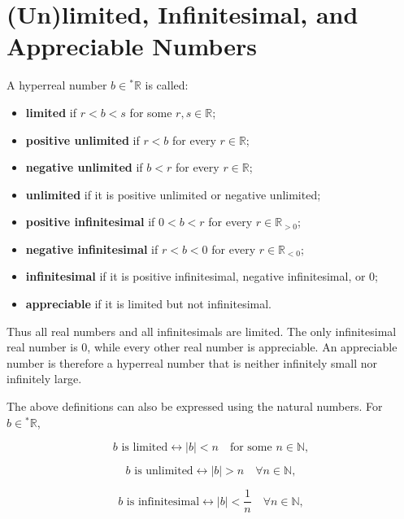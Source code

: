 \documentclass[10pt,a4paper]{book}
\begin{document}
\section{(Un)limited, Infinitesimal, and Appreciable Numbers}

A hyperreal number \(b\in{}^\ast\mathbb R\) is called:

\begin{itemize}

    \item \textbf{limited} if \(r<b<s\) for some \(r,s\in\mathbb R\);

    \item \textbf{positive unlimited} if \(r<b\) for every \(r\in\mathbb R\);

    \item \textbf{negative unlimited} if \(b<r\) for every \(r\in\mathbb R\);

    \item \textbf{unlimited} if it is positive unlimited or negative unlimited;

    \item \textbf{positive infinitesimal} if \(0<b<r\) for every \(r\in\mathbb R_{>0}\);

    \item \textbf{negative infinitesimal} if \(r<b<0\) for every \(r\in\mathbb R_{<0}\);

    \item \textbf{infinitesimal} if it is positive infinitesimal, negative infinitesimal, or \(0\);

    \item \textbf{appreciable} if it is limited but not infinitesimal.

\end{itemize}

Thus all real numbers and all infinitesimals are limited. The only
infinitesimal real number is \(0\), while every other real number is
appreciable. An appreciable number is therefore a hyperreal number that is
neither infinitely small nor infinitely large.

The above definitions can also be expressed using the natural numbers. For
\(b\in{}^\ast\mathbb R\),

$$
    b\text{ is limited}
    \leftrightarrow
    |b|<n
    \quad\text{for some }n\in\mathbb N,
$$

$$
    b\text{ is unlimited}
    \leftrightarrow
    |b|>n
    \quad\forall n\in\mathbb N,
$$

$$
    b\text{ is infinitesimal}
    \leftrightarrow
    |b|<\frac1n
    \quad\forall n\in\mathbb N,
$$
\end{document}
